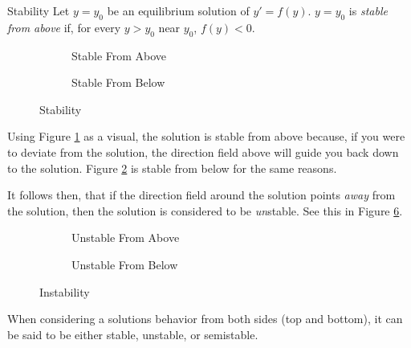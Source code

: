 \documentclass[12pt]{article}
\begin{document}
\begin{definition}{Stability}
  Let $y=y_0$ be an equilibrium solution of $y' = f(y)$. $y=y_0$ is \textit{stable from above} if, for every $y>y_0$ near $y_0$, $f(y)<0$.
\end{definition}

\begin{figure}[H]
  \centering
  \begin{subfigure}[H]{0.45\textwidth}
    \centering
    
    \caption{Stable From Above}
    \label{fig:002}
  \end{subfigure}
  \begin{subfigure}[H]{0.45\textwidth}
    \centering
    
    \caption{Stable From Below}
    \label{fig:003}
  \end{subfigure}
  \caption{Stability}
  \label{fig:stability}
  \vspace{-10pt}
\end{figure}
Using Figure \ref{fig:002} as a visual, the {\color{gr} solution} is stable from above because, if you were to deviate from the solution, the direction field above will guide you back down to the solution. Figure \ref{fig:003} is stable from below for the same reasons.

It follows then, that if the direction field around the solution points \textit{away} from the solution, then the solution is considered to be \textit{un}stable. See this in Figure \ref{fig:instability}.

\begin{figure}[H]
  \centering
  \begin{subfigure}[H]{0.45\textwidth}
    \centering
    
    \caption{Unstable From Above}
    \label{fig:004}
  \end{subfigure}
  \begin{subfigure}[H]{0.45\textwidth}
    \centering
    
    \caption{Unstable From Below}
    \label{fig:005}
  \end{subfigure}
  \caption{Instability}
  \label{fig:instability}
  \vspace{-10pt}
\end{figure}

When considering a solutions behavior from both sides (top and bottom), it can be said to be either stable, unstable, or semistable.
\end{document}
